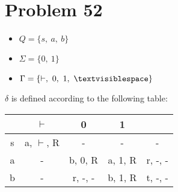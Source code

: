 \documentclass[11pt]{article}
\begin{document}
\section*{Problem 52}

\begin{itemize}
	\item $Q = \{ s,\ a,\ b \}$
	\item $\Sigma = \{0,\ 1\}$
	\item $\Gamma = \{ \vdash,\ 0,\ 1,\ \textvisiblespace\}$
\end{itemize}

$\delta$ is defined according to the following table:


\begin{tabular}{ c | c | c | c | c }
			& $\vdash$				& 0 					& 1				& \textvisiblespace \\
		\hline
		s	& a, $\vdash$, R		& -					& -				& - \\
		a	& -							& b, 0, R			& a, 1, R		& r, -, - \\
		b	& -							& r, -, -				& b, 1, R		& t, -, - \\
\end{tabular}
\end{document}
